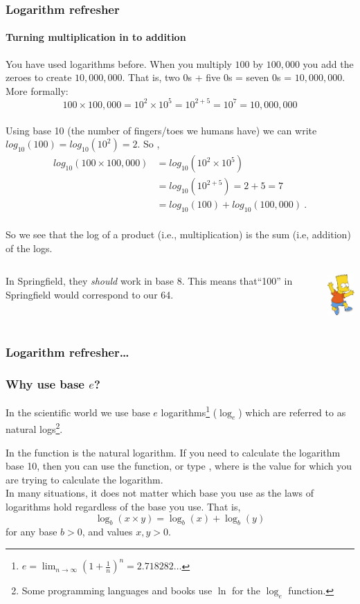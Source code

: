 \documentclass{beamer}\usepackage[]{graphicx}\usepackage[]{xcolor}
\begin{document}
\begin{frame}[fragile]
\frametitle{Logarithm refresher}
\framesubtitle{Turning multiplication in to addition}
You have used logarithms before.
When you multiply $100$ by $100,000$ you add the zeroes to create $10,000,000$.
That is, two $0$s + five $0$s = seven $0$s = $10,000,000$. 
More formally:
\[ 100\times 100,000 =10^{2}\times 10^{5}=10^{2+5}=10^7=10,000,000 \] \\[-5mm]

Using base 10 (the number of fingers/toes we humans have) we can write $log_{10}({100})=log_{10}({10^2})=2$.
So , 
\begin{align*}
log_{10}(100\times 100,000)&=log_{10}(10^2\times 10^5) \\
                        &=log_{10}(10^{2+5})=2+5=7 \\
                        &=log_{10}(100)+log_{10}(100,000) \ .\\
\end{align*}
\vspace{-30pt}

So we see that the log of a product (i.e., multiplication) is the sum (i.e, addition) of the logs. 

\begin{columns}
\begin{column}{0.85\textwidth}
{\scriptsize In Springfield, they {\em should} work in base 8.
This means that``100'' in Springfield would correspond to our 64.}
\end{column}
\begin{column}{0.15\textwidth}
\includegraphics[width=0.6in]{BartSimpson.jpg}
\end{column}
\end{columns}
\end{frame}



\begin{frame}[fragile]
\frametitle{Logarithm refresher\ldots}
\frametitle{Why use base $e$?}

In the scientific world we use base $e$ logarithms\footnote{$e=\lim_{n\to\infty}(1+\frac{1}{n})^{n}= 2.718282\ldots$} ($\log_e$) which are referred to as natural logs\footnote{Some programming languages and books use $\ln$ for the $\log_e$ function.}. 
\bigskip

In  the  function is the natural logarithm. If you need to calculate the logarithm base 10, then you can use the  function, or type , where  is the value for which you are trying to calculate the logarithm.\\
\bigskip
In many situations, it does not matter which base you use as the laws of logarithms hold regardless of the base you use. That is,
\[
\log_b(x\times y)=\log_b(x)+\log_b(y)
\]
for any base $b>0$, and values $x,y>0$.
\end{frame}
\end{document}
